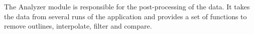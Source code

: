 The Analyzer module is responsible for the post-processing of the data. 
It takes the data from several runs of the application and provides a set of functions to remove outlines, interpolate, filter and compare.
